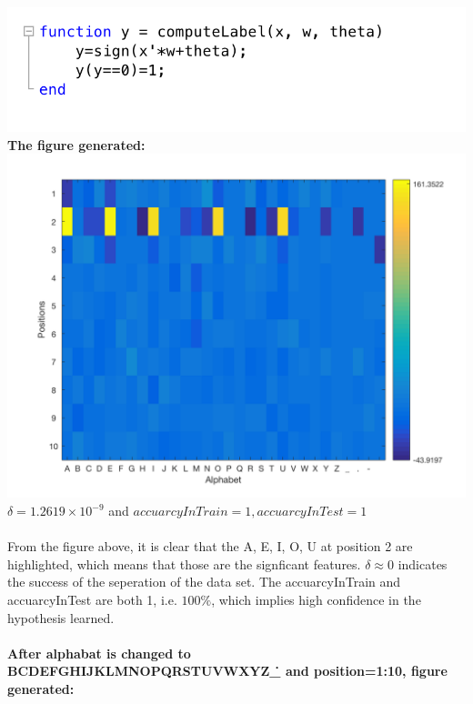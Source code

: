 \begin{enumerate}
\begin{enumerate}
					\includegraphics[scale=0.8]{pic/computeLabels.png}\\
					\textbf{The figure generated:}\\
					\includegraphics[scale=0.3]{pic/learnBadages.png}\\
					\(\delta=1.2619 \times 10^{-9}\) and \(accuarcyInTrain=1, accuarcyInTest=1\)\\\\
					From the figure above, it is clear that the A, E, I, O, U at position 2 are highlighted, which means that those are the signficant features. \(\delta \approx 0\) indicates the success of the seperation of the data set. The accuarcyInTrain and accuarcyInTest are both 1, i.e. \(100\%\), which implies high confidence in the hypothesis learned.\\\\
					\textbf{After alphabat is changed to BCDEFGHIJKLMNOPQRSTUVWXYZ\_\.\- and position=1:10, figure generated:}\\

\end{enumerate}
\end{enumerate}
